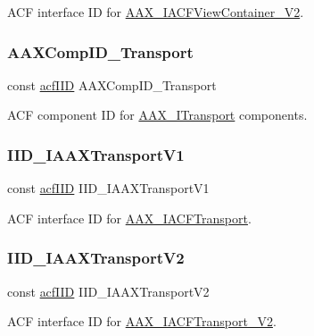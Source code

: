 A\+CF interface ID for \mbox{\hyperlink{a01769}{A\+A\+X\+\_\+\+I\+A\+C\+F\+View\+Container\+\_\+\+V2}}. 

\mbox{\label{a00683_aa407c13a2ddcc4c1078acb837c76003e}} 
\subsubsection{\texorpdfstring{AAXCompID\_Transport}{AAXCompID\_Transport}}
{\footnotesize\ttfamily const \mbox{\hyperlink{a00269_a59df0b41744eee7a066787aaedf97f67}{acf\+I\+ID}} A\+A\+X\+Comp\+I\+D\+\_\+\+Transport}



A\+CF component ID for \mbox{\hyperlink{a01885}{A\+A\+X\+\_\+\+I\+Transport}} components. 

\mbox{\label{a00683_af0982d7ceed67bd8b50476193cdbc7c3}} 
\subsubsection{\texorpdfstring{IID\_IAAXTransportV1}{IID\_IAAXTransportV1}}
{\footnotesize\ttfamily const \mbox{\hyperlink{a00269_a59df0b41744eee7a066787aaedf97f67}{acf\+I\+ID}} I\+I\+D\+\_\+\+I\+A\+A\+X\+Transport\+V1}



A\+CF interface ID for \mbox{\hyperlink{a01757}{A\+A\+X\+\_\+\+I\+A\+C\+F\+Transport}}. 

\mbox{\label{a00683_a766ade9b30cfff0223a033630ddfda3c}} 
\subsubsection{\texorpdfstring{IID\_IAAXTransportV2}{IID\_IAAXTransportV2}}
{\footnotesize\ttfamily const \mbox{\hyperlink{a00269_a59df0b41744eee7a066787aaedf97f67}{acf\+I\+ID}} I\+I\+D\+\_\+\+I\+A\+A\+X\+Transport\+V2}



A\+CF interface ID for \mbox{\hyperlink{a01761}{A\+A\+X\+\_\+\+I\+A\+C\+F\+Transport\+\_\+\+V2}}. 

